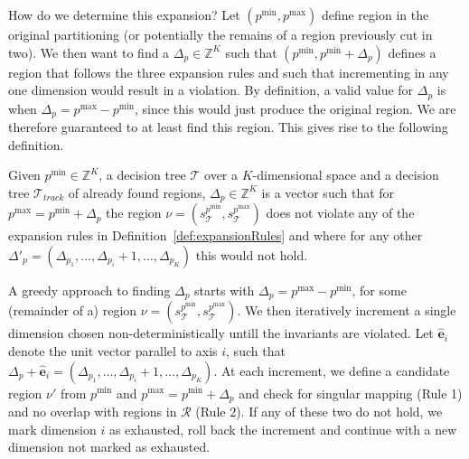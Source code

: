 How do we determine this expansion? Let $(p^{\min}, p^{\max})$ define region in
the original partitioning (or potentially the remains of a region previously cut
in two). We then want to find a $\Delta_p \in \mathbb{Z}^K$ such that
$(p^{\min}, p^{\min} + \Delta_p)$ defines a region that follows the three
expansion rules and such that incrementing in any one dimension would result in
a violation. By definition, a valid value for $\Delta_p$ is when $\Delta_p =
p^{\max} - p^{\min}$, since this would just produce the original region. We are
therefore guaranteed to at least find this region. This gives rise to the
following definition.



\begin{definition}
    Given $p^{\min} \in \mathbb{Z}^{K}$, a decision tree $\mathcal{T}$ over a
    $K$-dimensional space and a decision tree $\mathcal{T}_{track}$ of already
    found regions, $\Delta_{p} \in \mathbb{Z}^{K}$ is a vector such that for
    $p^{\max} = p^{\min} + \Delta_{p}$ the region $\nu =
    (s^{p^{\min}}_{\mathcal{T}}, s^{p^{\max}}_{\mathcal{T}})$ does not violate
    any of the expansion rules in Definition~\ref{def:expansionRules} and where
    for any other $\Delta'_p = (\Delta_{p_{1}}, \ldots, \Delta_{p_{i}} + 1,
    \ldots, \Delta_{p_{K}})$ this would not hold.
\end{definition}\label{def:deltaP}

\noindent A greedy approach to finding $\Delta_{p}$ starts with $\Delta_{p} =
p^{\max} - p^{\min}$, for some (remainder of a) region $\nu =
(s^{p^{\min}}_{\mathcal{T}}, s^{p^{\max}}_{\mathcal{T}})$. We then iteratively
increment a single dimension chosen non-deterministically untill the invariants
are violated.  Let $\mathbf{\hat{e}}_i$ denote the unit vector parallel to axis
$i$, such that $\Delta_{p} + \mathbf{\hat{e}}_i =
(\Delta_{p_1},\ldots,\Delta_{p_i} + 1,\ldots,\Delta_{p_K})$. At each increment,
we define a candidate region $\nu'$ from $p^{\min}$ and $p^{\max} = p^{\min} +
\Delta_{p}$ and check for singular mapping (Rule 1) and no overlap with regions
in $\mathcal{R}$ (Rule 2). If any of these two do not hold, we mark dimension
$i$ as exhausted, roll back the increment and continue with a new dimension not
marked as exhausted.

